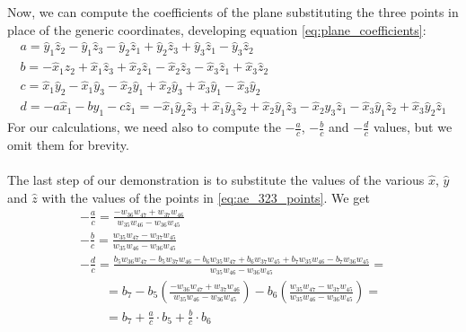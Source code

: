 Now, we can compute the coefficients of the plane substituting the three points in place of the generic coordinates, developing equation \ref{eq:plane_coefficients}:
\begin{equation}
    \begin{gathered}
        a = \hat{y}_{1} \hat{z}_{2} - \hat{y}_{1} \hat{z}_{3} - \hat{y}_{2} \hat{z}_{1} + \hat{y}_{2} \hat{z}_{3} + \hat{y}_{3} \hat{z}_{1} - \hat{y}_{3} \hat{z}_{2} \\
        b = - \hat{x}_{1} \hat{z}_{2} + \hat{x}_{1} \hat{z}_{3} + \hat{x}_{2} \hat{z}_{1} - \hat{x}_{2} \hat{z}_{3} - \hat{x}_{3} \hat{z}_{1} + \hat{x}_{3} \hat{z}_{2} \\
        c = \hat{x}_{1} \hat{y}_{2} - \hat{x}_{1} \hat{y}_{3} - \hat{x}_{2} \hat{y}_{1} + \hat{x}_{2} \hat{y}_{3} + \hat{x}_{3} \hat{y}_{1} - \hat{x}_{3} \hat{y}_{2} \\
        d = -a\hat{x}_1 - b\hat{y}_1 - c\hat{z}_1 = - \hat{x}_{1} \hat{y}_{2} \hat{z}_{3} + \hat{x}_{1} \hat{y}_{3} \hat{z}_{2} + \hat{x}_{2} \hat{y}_{1} \hat{z}_{3} - \hat{x}_{2} \hat{y}_{3} \hat{z}_{1} - \hat{x}_{3} \hat{y}_{1} \hat{z}_{2} + \hat{x}_{3} \hat{y}_{2} \hat{z}_{1}
    \end{gathered}
\end{equation}
For our calculations, we need also to compute the $-\frac{a}{c}$, $-\frac{b}{c}$ and $-\frac{d}{c}$ values, but we omit them for brevity.

\paragraph{}
The last step of our demonstration is to substitute the values of the various $\hat{x}$, $\hat{y}$ and $\hat{z}$ with the values of the points in \ref{eq:ae_323_points}. We get
\begin{equation}
    \begin{gathered}
        - \frac{a}{c} = \frac{- w_{36} w_{47} + w_{37} w_{46}}{w_{35} w_{46} - w_{36} w_{45}} \\
        - \frac{b}{c} = \frac{w_{35} w_{47} - w_{37} w_{45}}{w_{35} w_{46} - w_{36} w_{45}} \\
        - \frac{d}{c} = \frac{b_{5} w_{36} w_{47} - b_{5} w_{37} w_{46} - b_{6} w_{35} w_{47} + b_{6} w_{37} w_{45} + b_{7} w_{35} w_{46} - b_{7} w_{36} w_{45}}{w_{35} w_{46} - w_{36} w_{45}} = \\
        \quad\quad = b_7 - b_5 \left (\frac{- w_{36} w_{47} + w_{37} w_{46}}{w_{35} w_{46} - w_{36} w_{45}} \right ) - b_6 \left (\frac{w_{35} w_{47} - w_{37} w_{45}}{w_{35} w_{46} - w_{36} w_{45}} \right ) = \\
        \quad\quad = b_7 + \frac{a}{c} \cdot b_5 + \frac{b}{c} \cdot b_6
    \end{gathered}
\end{equation}

